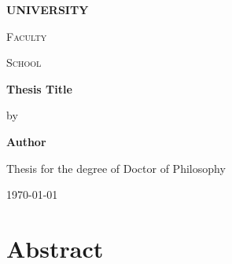 \documentclass[12pt,a4paper,twoside]{report}
\begin{document}
	
\listoftodos

\pagestyle{fancy}
\fancyhf{}
\fancyhead[RE,LO]{\leftmark}%
\fancyhead[LE,RO]{\thepage}
\renewcommand{\chaptermark}[1]{\markboth{\chaptername\ \thechapter\ #1}{}}



\begin{titlepage}
	\centering
	{\large \bfseries \uppercase{University} \par}
	\vspace{0.5cm}
	{\scshape\large Faculty \par}
	\vspace{0.25cm}
	{\scshape\large School \par}
	\vspace{5cm}
	{\bfseries\large Thesis Title\par}
	\vspace{1cm}
	{\large by \par}
	\vspace{1cm}
	{\bfseries\large  Author\par}
	
	\vfill
	
	{\large Thesis for the degree of Doctor of Philosophy \par}
	\vspace{1cm}		
	{\large \monthyeardate\today \par}
\end{titlepage}


\thispagestyle{empty}

\chapter*{\centering Abstract}



\thispagestyle{empty}
\chapterEnd %

	
\glsunsetall
	
\end{document}
